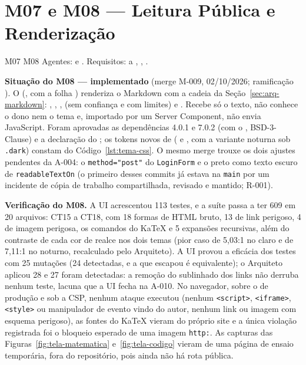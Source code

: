


\section{M07 e M08 --- Leitura Pública e Renderização}\label{sec:impl-leitura}

\noindent M07 \quad M08 \quad Agentes:  e . Requisitos:  a , , .

\textbf{Situação do M08 --- implementado} (merge M-009, 02/10/2026; ramificação ). O  (\allowbreak{}, com a folha ) renderiza o Markdown com a cadeia da Seção~\ref{sec:arq-markdown}: , , ,  (sem confiança e com limites) e . Recebe só o texto, não conhece o dono nem o tema e, importado por um Server Component, não envia JavaScript. Foram aprovadas as dependências  4.0.1 e  7.0.2 (com o , BSD-3-Clause) e a declaração do ; os tokens novos de  ( e , com a variante noturna sob \texttt{.dark}) constam do Código~\ref{lst:tema-css}. O mesmo merge trouxe os dois ajustes pendentes da A-004: o \texttt{method="post"} do \texttt{LoginForm} e o preto como texto escuro de \texttt{readableTextOn} (o primeiro desses commits já estava na \texttt{main} por um incidente de cópia de trabalho compartilhada, revisado e mantido; R-001).

\textbf{Verificação do M08.} A UI acrescentou 113 testes, e a suíte passa a ter 609 em 20 arquivos: CT15 a CT18, com 18 formas de HTML bruto, 13 de link perigoso, 4 de imagem perigosa, os comandos do KaTeX e 5 expansões recursivas, além do contraste de cada cor de realce nos dois temas (pior caso de 5,03:1 no claro e de 7,11:1 no noturno, recalculado pelo Arquiteto). A UI provou a eficácia dos testes com 25 mutações (24 detectadas, e a que escapou é equivalente); o Arquiteto aplicou 28 e 27 foram detectadas: a remoção do sublinhado dos links não derruba nenhum teste, lacuna que a UI fecha na A-010. No navegador, sobre o  de produção e sob a CSP, nenhum ataque executou (nenhum \texttt{<script>}, \texttt{<iframe>}, \texttt{<style>} ou manipulador de evento vindo do autor, nenhum link ou imagem com esquema perigoso), as fontes do KaTeX vieram do próprio site e a única violação registrada foi o bloqueio esperado de uma imagem \texttt{http:}. As capturas das Figuras~\ref{fig:tela-matematica} e~\ref{fig:tela-codigo} vieram de uma página de ensaio temporária, fora do repositório, pois ainda não há rota pública.

